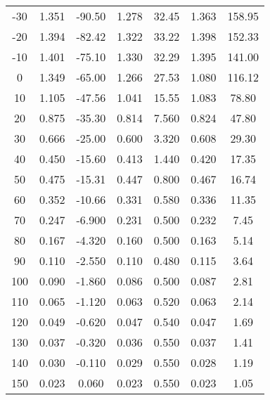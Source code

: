 \begin{table}
\begin{center}
\begin{tabular}{c|cc|cc|cc}
		-30 & 1.351 & -90.50 & 1.278 & 32.45	& 1.363 &	158.95 \\
		-20 & 1.394 & -82.42 & 1.322 & 33.22	& 1.398 &	152.33 \\
		-10 & 1.401 & -75.10 & 1.330 & 32.29	& 1.395 &	141.00 \\
		0	& 1.349 & -65.00 & 1.266 & 27.53 & 1.080 & 116.12 \\
		10 & 1.105 & -47.56 & 1.041 & 15.55 & 1.083 & 78.80 \\
		20 & 0.875 & -35.30 & 0.814 & 7.560 & 0.824 & 47.80 \\
		30 & 0.666 & -25.00 & 0.600 & 3.320 & 0.608 & 29.30 \\
		40 & 0.450 & -15.60 & 0.413 & 1.440 & 0.420 & 17.35 \\
		50 & 0.475 & -15.31 & 0.447 & 0.800 & 0.467 & 16.74 \\
		60 & 0.352 & -10.66 & 0.331 & 0.580 & 0.336 & 11.35 \\
		70 & 0.247 & -6.900 & 0.231 & 0.500 & 0.232 & 7.45 \\
		80 & 0.167 & -4.320 & 0.160 & 0.500 & 0.163 & 5.14 \\
		90 & 0.110 & -2.550 & 0.110 & 0.480 & 0.115 & 3.64 \\
		100	& 0.090 &	-1.860 & 0.086 & 0.500 & 0.087 & 2.81 \\
		110	& 0.065 &	-1.120 & 0.063 & 0.520 & 0.063 & 2.14 \\
		120	& 0.049 &	-0.620 & 0.047 & 0.540 & 0.047 & 1.69 \\
		130	& 0.037 &	-0.320 & 0.036 & 0.550 & 0.037 & 1.41 \\
		140	& 0.030 &	-0.110 & 0.029 & 0.550 & 0.028 & 1.19 \\
		150	& 0.023	& 0.060	& 0.023 &	0.550 &	0.023 &	1.05 \\
  \end{tabular}
	\label{tab:probe_A}
	\end{center}

\end{table}
\endgroup

